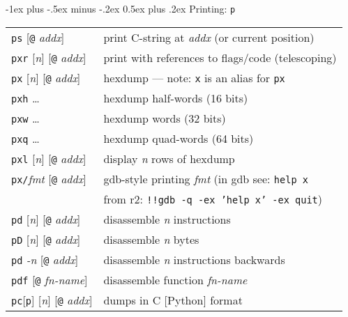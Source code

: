 \documentclass[a4paper,landscape]{article}
\makeatletter
\renewcommand{\section}{\@startsection{section}{1}{0mm}%
                                {-1ex plus -.5ex minus -.2ex}%
                                {0.5ex plus .2ex}%
                                {\normalfont\large\bfseries}}
\makeatother
\begin{document}
\begin{multicols*}{3}
\section{Printing: \texttt{p}}
\begin{tabular}{@{}ll@{}}
\texttt{ps} [\texttt{@} \textit{addx}]& print C-string at \textit{addx} (or current position) \\
\texttt{pxr} [\textit{n}] [\texttt{@} \textit{addx}] & print with references to flags/code (telescoping) \\
\texttt{px} [\textit{n}] [\texttt{@} \textit{addx}] & hexdump --- note: \texttt{x} is an alias for \texttt{px}\\
\texttt{pxh} \ldots & hexdump half-words (16 bits) \\
\texttt{pxw} \ldots & hexdump words (32 bits) \\
\texttt{pxq} \ldots & hexdump quad-words (64 bits) \\
\texttt{pxl} [\textit{n}] [\texttt{@} \textit{addx}] & display \textit{n} rows of hexdump \\
\texttt{px/}\textit{fmt} [\texttt{@} \textit{addx}] & gdb-style printing \textit{fmt} (in gdb see: \texttt{help x} \\ & from r2: \texttt{!!gdb -q -ex 'help x' -ex quit}) \\
\texttt{pd} [\textit{n}] [\texttt{@} \textit{addx}] & disassemble \textit{n} instructions \\
\texttt{pD} [\textit{n}] [\texttt{@} \textit{addx}] & disassemble \textit{n} bytes \\
\texttt{pd} \textit{-n}  [\texttt{@} \textit{addx}] & disassemble \textit{n} instructions backwards \\
\texttt{pdf} [\texttt{@} \textit{fn-name}] & disassemble function \textit{fn-name} \\
\texttt{pc}[\texttt{p}] [\textit{n}] [\texttt{@} \textit{addx}] & dumps in C [Python] format \\
\end{tabular}


\end{multicols*}
\end{document}
